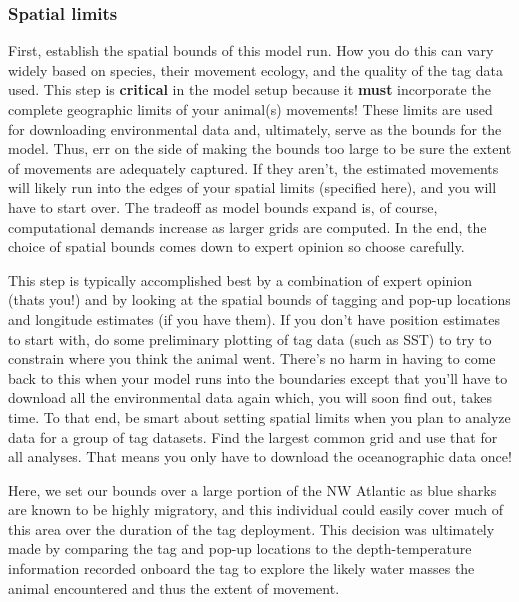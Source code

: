 \documentclass{article}\usepackage[]{graphicx}\usepackage[]{color}
\begin{document}
\subsubsection{Spatial limits}
First, establish the spatial bounds of this model run. How you do this can vary widely based on species, their movement ecology, and the quality of the tag data used. This step is \textbf{critical} in the model setup because it \textbf{must} incorporate the complete geographic limits of your animal(s) movements! These limits are used for downloading environmental data and, ultimately, serve as the bounds for the model. Thus, err on the side of making the bounds too large to be sure the extent of movements are adequately captured. If they aren't, the estimated movements will likely run into the edges of your spatial limits (specified here), and you will have to start over. The tradeoff as model bounds expand is, of course, computational demands increase as larger grids are computed. In the end, the choice of spatial bounds comes down to expert opinion so choose carefully.

This step is typically accomplished best by a combination of expert opinion (thats you!) and by looking at the spatial bounds of tagging and pop-up locations and longitude estimates (if you have them). If you don't have position estimates to start with, do some preliminary plotting of tag data (such as SST) to try to constrain where you think the animal went. There's no harm in having to come back to this when your model runs into the boundaries except that you'll have to download all the environmental data again which, you will soon find out, takes time. To that end, be smart about setting spatial limits when you plan to analyze data for a group of tag datasets. Find the largest common grid and use that for all analyses. That means you only have to download the oceanographic data once!

Here, we set our bounds over a large portion of the NW Atlantic as blue sharks are known to be highly migratory, and this individual could easily cover much of this area over the duration of the tag deployment. This decision was ultimately made by comparing the tag and pop-up locations to the depth-temperature information recorded onboard the tag to explore the likely water masses the animal encountered and thus the extent of movement.
\end{document}
